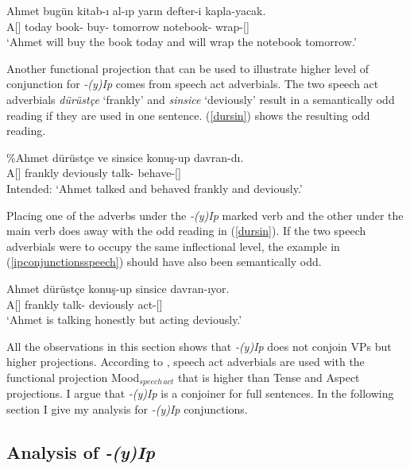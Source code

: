 \begin{exe}
\ex \label{ipconjunctionstime}
\gll Ahmet bugün kitab-ı al-ıp yarın defter-i kapla-yacak. \\
A[{\Nom}] today book-{\Acc} buy-{\Pc} tomorrow notebook-{\Acc} wrap-{\Fut}[{\Tsg}] \\
\glt `Ahmet will buy the book today and will wrap the notebook tomorrow.'
\end{exe}

Another functional projection that can be used to illustrate higher level of conjunction for \textit{-(y)Ip} comes from speech act adverbials. The two speech act adverbials \textit{dürüstçe} `frankly' and \textit{sinsice} `deviously' result in a semantically odd reading if they are used in one sentence. (\ref{dursin}) shows the resulting odd reading.

\begin{exe}
\ex \label{dursin} 
\gll \%Ahmet dürüstçe ve sinsice konuş-up davran-dı. \\ 
A[{\Nom}] frankly {\And} deviously talk-{\Pc} behave-{\Pst}[{\Tsg}] \\
\glt Intended: `Ahmet talked and behaved frankly and deviously.'
\end{exe}

Placing one of the adverbs under the \textit{-(y)Ip} marked verb and the other under the main verb does away with the odd reading in (\ref{dursin}). If the two speech adverbials were to occupy the same inflectional level, the example in (\ref{ipconjunctionsspeech}) should have also been semantically odd.

\begin{exe}
\ex \label{ipconjunctionsspeech}
\gll Ahmet dürüstçe konuş-up sinsice davran-ıyor. \\
A[{\Nom}] frankly talk-{\Pc} deviously act-{\Prog}[{\Tsg}] \\
\glt `Ahmet is talking honestly but acting deviously.'
\end{exe}

All the observations in this section shows that \textit{-(y)Ip} does not conjoin VPs but higher projections. According to \cite{cinque1999adverbs}, speech act adverbials are used with the functional projection Mood$_{speech\,act}$ that is higher than Tense and Aspect projections. I argue that \textit{-(y)Ip} is a conjoiner for full sentences. In the following section I give my analysis for \textit{-(y)Ip} conjunctions.


\subsection{Analysis of \textit{-(y)Ip}}

